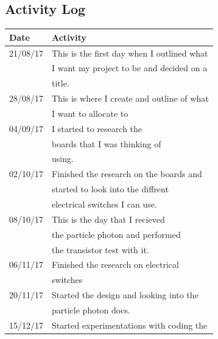 \documentclass{article}
\begin{document}
\subsection{Activity Log}

\begin{tabularx}{\textwidth}{| X | X |}
    \hline
    \textbf{Date}            &               \textbf{Activity}           \\ \hline
    21/08/17                 &This is the first day when I outlined what \\
                             &I want my project to be and decided on a   \\
                             &title.                                     \\ \hline
    28/08/17                 &This is where I create and outline of what \\
                             &I want to allocate to                      \\ \hline
    04/09/17                 &I started to research the                  \\
                             &boards that I was thinking of              \\
                             &using.                                     \\ \hline
    02/10/17                 &Finished the research on the boards and    \\
                             &started to look into the diffrent          \\
                             &electrical switches I can use.             \\ \hline
    08/10/17                 &This is the day that I recieved            \\
                             &the particle photon and performed          \\
                             &the transistor test with it.               \\ \hline
    06/11/17                 &Finished the research on electrical        \\
                             &switches                                   \\ \hline
    20/11/17                 &Started the design and looking into the    \\
                             &particle photon docs.                      \\ \hline
    15/12/17                 &Started experimentations with coding the   \\

\end{tabularx}
\end{document}
